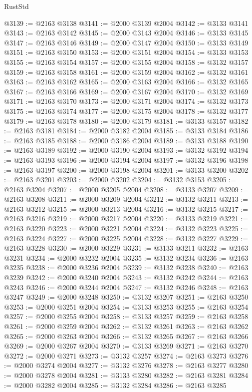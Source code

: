 \begin{lexlean}{RustStd}
\begin{coremodule}
@3139 := @2163 @3138
@3141 := @2000 @3139 @2004
@3142 := @3133 @3141
@3143 := @2163 @3142
@3145 := @2000 @3143 @2004
@3146 := @3133 @3145
@3147 := @2163 @3146
@3149 := @2000 @3147 @2004
@3150 := @3133 @3149
@3151 := @2163 @3150
@3153 := @2000 @3151 @2004
@3154 := @3133 @3153
@3155 := @2163 @3154
@3157 := @2000 @3155 @2004
@3158 := @3132 @3157
@3159 := @2163 @3158
@3161 := @2000 @3159 @2004
@3162 := @3132 @3161
@3163 := @2163 @3162
@3165 := @2000 @3163 @2004
@3166 := @3132 @3165
@3167 := @2163 @3166
@3169 := @2000 @3167 @2004
@3170 := @3132 @3169
@3171 := @2163 @3170
@3173 := @2000 @3171 @2004
@3174 := @3132 @3173
@3175 := @2163 @3174
@3177 := @2000 @3175 @2004
@3178 := @3132 @3177
@3179 := @2163 @3178
@3180 := @2000 @3179
@3181 := @3133 @3157
@3182 := @2163 @3181
@3184 := @2000 @3182 @2004
@3185 := @3133 @3184
@3186 := @2163 @3185
@3188 := @2000 @3186 @2004
@3189 := @3133 @3188
@3190 := @2163 @3189
@3192 := @2000 @3190 @2004
@3193 := @3132 @3192
@3194 := @2163 @3193
@3196 := @2000 @3194 @2004
@3197 := @3132 @3196
@3198 := @2163 @3197
@3200 := @2000 @3198 @2004
@3201 := @3133 @3200
@3202 := @2163 @3201
@3203 := @2000 @3202
@3204 := @3132 @3153
@3205 := @2163 @3204
@3207 := @2000 @3205 @2004
@3208 := @3133 @3207
@3209 := @2163 @3208
@3211 := @2000 @3209 @2004
@3212 := @3132 @3211
@3213 := @2163 @3212
@3215 := @2000 @3213 @2004
@3216 := @3132 @3215
@3217 := @2163 @3216
@3219 := @2000 @3217 @2004
@3220 := @3133 @3219
@3221 := @2163 @3220
@3223 := @2000 @3221 @2004
@3224 := @3132 @3223
@3225 := @2163 @3224
@3227 := @2000 @3225 @2004
@3228 := @3132 @3227
@3229 := @2163 @3228
@3230 := @2000 @3229
@3231 := @3133 @3211
@3232 := @2163 @3231
@3234 := @2000 @3232 @2004
@3235 := @3132 @3234
@3236 := @2163 @3235
@3238 := @2000 @3236 @2004
@3239 := @3132 @3238
@3240 := @2163 @3239
@3242 := @2000 @3240 @2004
@3243 := @3132 @3242
@3244 := @2163 @3243
@3246 := @2000 @3244 @2004
@3247 := @3132 @3246
@3248 := @2163 @3247
@3249 := @2000 @3248
@3250 := @3132 @3207
@3251 := @2163 @3250
@3253 := @2000 @3251 @2004
@3254 := @3133 @3253
@3255 := @2163 @3254
@3257 := @2000 @3255 @2004
@3258 := @3133 @3257
@3259 := @2163 @3258
@3261 := @2000 @3259 @2004
@3262 := @3132 @3261
@3263 := @2163 @3262
@3265 := @2000 @3263 @2004
@3266 := @3132 @3265
@3267 := @2163 @3266
@3269 := @2000 @3267 @2004
@3270 := @3133 @3269
@3271 := @2163 @3270
@3272 := @2000 @3271
@3273 := @3132 @3257
@3274 := @2163 @3273
@3276 := @2000 @3274 @2004
@3277 := @3132 @3276
@3278 := @2163 @3277
@3280 := @2000 @3278 @2004
@3281 := @3133 @3280
@3282 := @2163 @3281
@3284 := @2000 @3282 @2004
@3285 := @3132 @3284
@3286 := @2163 @3285

\end{coremodule}
\end{lexlean}
